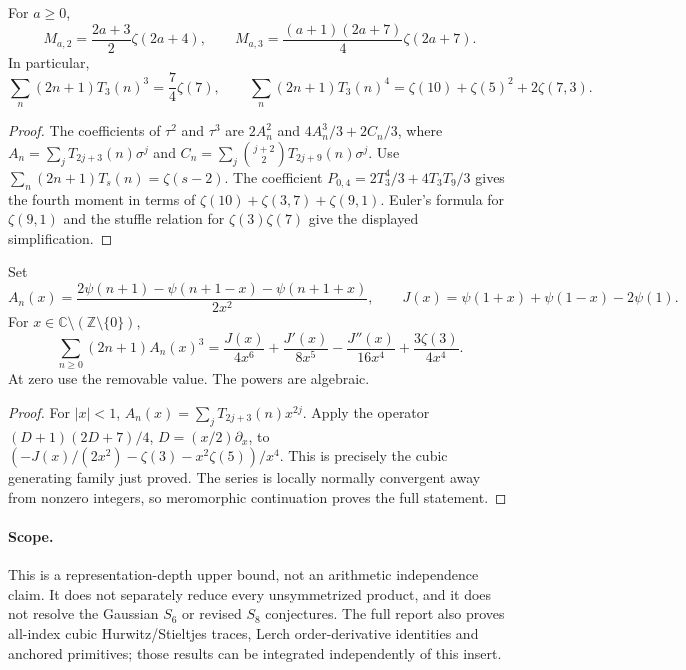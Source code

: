\begin{corollary}\label{cti:moments}
For $a\ge0$,
\[
 M_{a,2}=\frac{2a+3}{2}\zeta(2a+4),\qquad
 M_{a,3}=\frac{(a+1)(2a+7)}4\zeta(2a+7).
\]
In particular,
\[
 \sum_n(2n+1)T_3(n)^3=\frac74\zeta(7),\qquad
 \sum_n(2n+1)T_3(n)^4=\zeta(10)+\zeta(5)^2+2\zeta(7,3).
\]
\end{corollary}
\begin{proof}
The coefficients of $\tau^2$ and $\tau^3$ are
$2A_n^2$ and $4A_n^3/3+2C_n/3$, where
$A_n=\sum_jT_{2j+3}(n)\sigma^j$ and
$C_n=\sum_j\binom{j+2}{2}T_{2j+9}(n)\sigma^j$.
Use $\sum_n(2n+1)T_s(n)=\zeta(s-2)$.
The coefficient $P_{0,4}=2T_3^4/3+4T_3T_9/3$ gives the fourth moment in
terms of $\zeta(10)+\zeta(3,7)+\zeta(9,1)$.
Euler's formula for $\zeta(9,1)$ and the stuffle relation for
$\zeta(3)\zeta(7)$ give the displayed simplification.
\end{proof}

\begin{theorem}\label{cti:digamma}
Set
\[
 A_n(x)=\frac{2\psi(n+1)-\psi(n+1-x)-\psi(n+1+x)}{2x^2},\qquad
 J(x)=\psi(1+x)+\psi(1-x)-2\psi(1).
\]
For $x\in\mathbb C\setminus(\mathbb Z\setminus\{0\})$,
\[
 \sum_{n\ge0}(2n+1)A_n(x)^3
 =\frac{J(x)}{4x^6}+\frac{J'(x)}{8x^5}
       -\frac{J''(x)}{16x^4}+\frac{3\zeta(3)}{4x^4}.
\]
At zero use the removable value. The powers are algebraic.
\end{theorem}
\begin{proof}
For $|x|<1$, $A_n(x)=\sum_jT_{2j+3}(n)x^{2j}$.
Apply the operator $(D+1)(2D+7)/4$, $D=(x/2)\partial_x$, to
$(-J(x)/(2x^2)-\zeta(3)-x^2\zeta(5))/x^4$.
This is precisely the cubic generating family just proved.
The series is locally normally convergent away from nonzero integers,
so meromorphic continuation proves the full statement.
\end{proof}

\paragraph{Scope.}
This is a representation-depth upper bound, not an arithmetic independence
claim. It does not separately reduce every unsymmetrized product, and it
does not resolve the Gaussian $S_6$ or revised $S_8$ conjectures.
The full report also proves all-index cubic Hurwitz/Stieltjes traces,
Lerch order-derivative identities and anchored primitives; those results
can be integrated independently of this insert.
